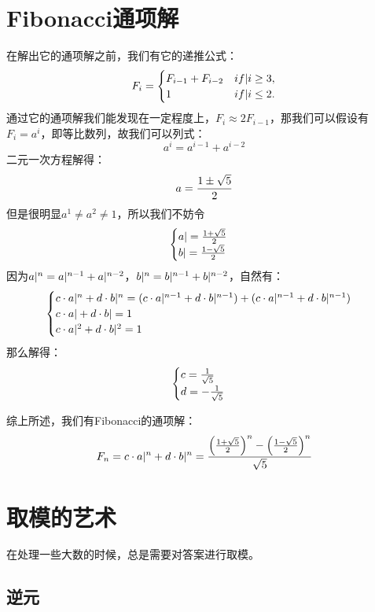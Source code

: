 
\section{Fibonacci通项解}

在解出它的通项解之前，我们有它的递推公式：
$$F_i=\begin{cases}
    F_{i-1} + F_{i-2}   & \*if |i \ge 3, \\
    1                   & \*if |i \le 2.
\end{cases}$$
通过它的通项解我们能发现在一定程度上，$F_i\approx 2F_{i-1}$，那我们可以假设有$
F_i = a^i$，即等比数列，故我们可以列式：
$$a^i = a^{i-1} + a^{i-2}$$
二元一次方程解得：
$$a={1\pm \sqrt{5} \over 2}$$
但是很明显$a^1\ne a^2 \ne 1$，所以我们不妨令
$$\begin{cases}\*a|={1+\sqrt{5} \over 2} \\
\*b|={1-\sqrt{5} \over 2}\end{cases}$$
因为$\*a|^n=\*a|^{n-1}+\*a|^{n-2}$，$\*b|^n=\*b|^{n-1}+\*b|^{n-2}$，自然有：
$$\begin{cases}
    c\cdot\*a|^n + d\cdot\*b|^n = (c\cdot\*a|^{n-1} + d\cdot \*b|^{n-1}) + 
                                  (c\cdot\*a|^{n-1} + d\cdot \*b|^{n-1})    \\
    c\cdot\*a| + d\cdot\*b| = 1                                             \\
    c\cdot\*a|^2 + d\cdot\*b|^2 = 1
\end{cases}$$
那么解得：
$$\begin{cases}c = {1\over\sqrt5} \\
d = -{1\over\sqrt5}\end{cases}$$

综上所述，我们有Fibonacci的通项解：
$$F_n = c\cdot\*a|^n + d\cdot\*b|^n =
        { \left({1+\sqrt5\over2}\right)^n -
          \left({1-\sqrt5\over2}\right)^n \over\sqrt5}$$


\section{取模的艺术}

在处理一些大数的时候，总是需要对答案进行取模。

\subsection{逆元}




